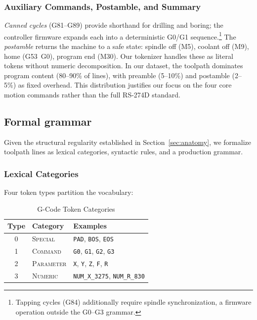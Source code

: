 \documentclass[sensors,article,submit,moreauthors,pdftex]{Definitions/mdpi}
\begin{document}
\subsubsection{Auxiliary Commands, Postamble, and Summary}

\emph{Canned cycles} (G81--G89) provide shorthand for drilling and boring; the controller firmware expands each into a deterministic G0/G1 sequence.\footnote{Tapping cycles (G84) additionally require spindle synchronization, a firmware operation outside the G0--G3 grammar.} The \emph{postamble} returns the machine to a safe state: spindle off (M5), coolant off (M9), home (G53~G0), program end (M30). Our tokenizer handles these as literal tokens without numeric decomposition. In our dataset, the toolpath dominates program content (80--90\% of lines), with preamble (5--10\%) and postamble (2--5\%) as fixed overhead. This distribution justifies our focus on the four core motion commands rather than the full RS-274D standard.

\subsection{Formal grammar}
\label{sec:grammar}

Given the structural regularity established in Section~\ref{sec:anatomy}, we formalize toolpath lines as lexical categories, syntactic rules, and a production grammar.

\subsubsection{Lexical Categories}

Four token types partition the vocabulary:

\begin{table}[htbp]
\centering
\caption{G-Code Token Categories}
\label{tab:token_categories}
\begin{tabular}{@{}clp{3.2cm}@{}}
\toprule
\textbf{Type} & \textbf{Category} & \textbf{Examples} \\
\midrule
0 & \textsc{Special}   & \texttt{PAD}, \texttt{BOS}, \texttt{EOS} \\
1 & \textsc{Command}   & \texttt{G0}, \texttt{G1}, \texttt{G2}, \texttt{G3} \\
2 & \textsc{Parameter} & \texttt{X}, \texttt{Y}, \texttt{Z}, \texttt{F}, \texttt{R} \\
3 & \textsc{Numeric}   & \texttt{NUM\_X\_3275}, \texttt{NUM\_R\_830} \\
\bottomrule
\end{tabular}
\end{table}
\end{document}
